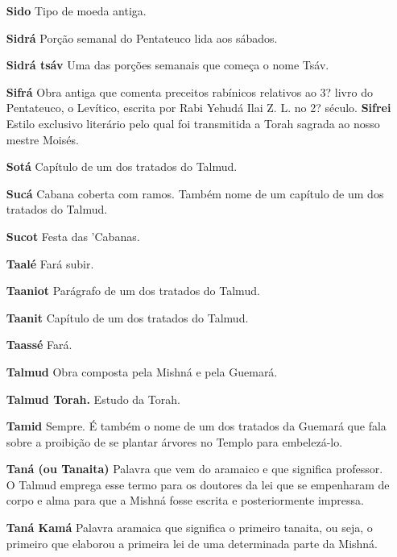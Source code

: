 \begin{itemize}
\item[\textbf{Sido}] Tipo de moeda antiga.

\item[\textbf{Sidrá}] Porção semanal do Pentateu­co lida aos sábados.

\item[\textbf{Sidrá tsáv}] Uma das porções sema­nais que começa o nome Tsáv.

\item[\textbf{Sifrá}] Obra antiga que comenta pre­ceitos rabínicos relativos
ao 3? livro do Pentateuco, o Levítico, escrita por Ra­bi Yehudá Ilai Z.
L. no 2? século. \textbf{Sifrei} Estilo exclusivo literário pelo qual
foi transmitida a Torah sagrada ao nosso mestre Moisés.

\item[\textbf{Sotá}] Capítulo de um dos tratados do Talmud.

\item[\textbf{Sucá}] Cabana coberta com ramos. Também nome de um capítulo de um dos
tratados do Talmud.

\item[\textbf{Sucot}] Festa das 'Cabanas.

\item[\textbf{Taalé}] Fará subir.

\item[\textbf{Taaniot}] Parágrafo de um dos trata­dos do Talmud.

\item[\textbf{Taanit}] Capítulo de um dos tratados do Talmud.

\item[\textbf{Taassé}] Fará.

\item[\textbf{Talmud}] Obra composta pela Mish­ná e pela Guemará.

\item[\textbf{Talmud Torah.}] Estudo da Torah.


\item[\textbf{Tamid}] Sempre. É também o nome de um dos tratados da Guemará que fala
sobre a proibição de se plantar árvo­res no Templo para embelezá-lo.

\item[\textbf{Taná (ou Tanaita)}] Palavra que vem do aramaico e que significa
professor. O Talmud emprega esse termo para os doutores da lei que se
empenharam de corpo e alma para que a Mishná fosse escrita e
posteriormente impressa.

\item[\textbf{Taná Kamá}] Palavra aramaica que sig­nifica o primeiro tanaita,
ou seja, o pri­meiro que elaborou a primeira lei de uma determinada
parte da Mishná.


\end{itemize}
